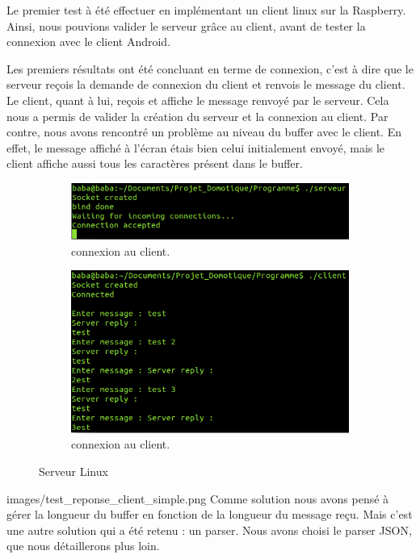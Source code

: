\documentclass[a4paper,10pt]{article}
\begin{document}
Le premier test à été effectuer en implémentant un client linux sur la Raspberry. Ainsi, nous pouvions valider le serveur grâce au client, avant de tester la connexion avec le client Android.

Les premiers résultats ont été concluant en terme de connexion, c'est à dire que le serveur reçois la demande de connexion du client et renvois le message du client. Le client, quant à lui, reçois et affiche le message renvoyé par le serveur. Cela nous a permis de valider la création du serveur et la connexion au client. Par contre, nous avons rencontré un problème au niveau du buffer avec le client. En effet, le message affiché à l'écran étais bien celui initialement envoyé, mais le client affiche aussi tous les caractères présent dans le buffer. %
\begin{figure}[H]
	\centering
	\begin{subfigure}[b]{0.3\textwidth}
		\includegraphics[scale=0.5]{images/serveur_simple_ex.png}
		\caption{connexion au client.}
		\label{fig:serveur_simple}
	\end{subfigure}
	\quad
	\begin{subfigure}[b]{0.3\textwidth}
		\includegraphics[scale=0.5]{images/test_reponse_client_simple.png}
		\caption{connexion au client.}
		\label{fig:serveur_simple_reponse}
	\end{subfigure}
\caption{Serveur Linux}
\end{figure}
images/test_reponse_client_simple.png
Comme solution nous avons pensé à gérer la longueur du buffer en fonction de la longueur du message reçu. Mais c'est une autre solution qui a été retenu : un parser. Nous avons choisi le parser JSON, que nous détaillerons plus loin.
\end{document}
